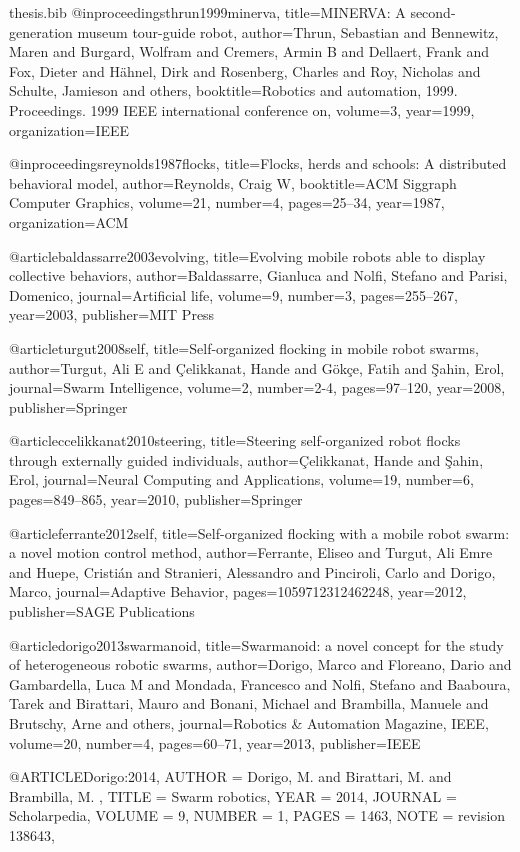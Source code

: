 \documentclass[oneside, a4paper, 12pt]{memoir}
\begin{document}
\begin{filecontents}{thesis.bib}
@inproceedings{thrun1999minerva,
  title={MINERVA: A second-generation museum tour-guide robot},
  author={Thrun, Sebastian and Bennewitz, Maren and Burgard, Wolfram and Cremers, Armin B and Dellaert, Frank and Fox, Dieter and H{\"a}hnel, Dirk and Rosenberg, Charles and Roy, Nicholas and Schulte, Jamieson and others},
  booktitle={Robotics and automation, 1999. Proceedings. 1999 IEEE international conference on},
  volume={3},
  year={1999},
  organization={IEEE}
}

@inproceedings{reynolds1987flocks,
  title={Flocks, herds and schools: A distributed behavioral model},
  author={Reynolds, Craig W},
  booktitle={ACM Siggraph Computer Graphics},
  volume={21},
  number={4},
  pages={25--34},
  year={1987},
  organization={ACM}
}

@article{baldassarre2003evolving,
  title={Evolving mobile robots able to display collective behaviors},
  author={Baldassarre, Gianluca and Nolfi, Stefano and Parisi, Domenico},
  journal={Artificial life},
  volume={9},
  number={3},
  pages={255--267},
  year={2003},
  publisher={MIT Press}
}

@article{turgut2008self,
  title={Self-organized flocking in mobile robot swarms},
  author={Turgut, Ali E and {\c{C}}elikkanat, Hande and G{\"o}k{\c{c}}e, Fatih and {\c{S}}ahin, Erol},
  journal={Swarm Intelligence},
  volume={2},
  number={2-4},
  pages={97--120},
  year={2008},
  publisher={Springer}
}

@article{ccelikkanat2010steering,
  title={Steering self-organized robot flocks through externally guided individuals},
  author={{\c{C}}elikkanat, Hande and {\c{S}}ahin, Erol},
  journal={Neural Computing and Applications},
  volume={19},
  number={6},
  pages={849--865},
  year={2010},
  publisher={Springer}
}

@article{ferrante2012self,
  title={Self-organized flocking with a mobile robot swarm: a novel motion control method},
  author={Ferrante, Eliseo and Turgut, Ali Emre and Huepe, Cristi{\'a}n and Stranieri, Alessandro and Pinciroli, Carlo and Dorigo, Marco},
  journal={Adaptive Behavior},
  pages={1059712312462248},
  year={2012},
  publisher={SAGE Publications}
}

@article{dorigo2013swarmanoid,
  title={Swarmanoid: a novel concept for the study of heterogeneous robotic swarms},
  author={Dorigo, Marco and Floreano, Dario and Gambardella, Luca M and Mondada, Francesco and Nolfi, Stefano and Baaboura, Tarek and Birattari, Mauro and Bonani, Michael and Brambilla, Manuele and Brutschy, Arne and others},
  journal={Robotics \& Automation Magazine, IEEE},
  volume={20},
  number={4},
  pages={60--71},
  year={2013},
  publisher={IEEE}
}

@ARTICLE{Dorigo:2014,
AUTHOR = {Dorigo, M.  and Birattari, M.  and Brambilla, M. },
TITLE   = {{S}warm robotics},
YEAR	= 2014,
JOURNAL	= Scholarpedia,
VOLUME  = 9,
NUMBER  = 1,
PAGES   = 1463,
NOTE   = {{revision 138643}},
}

\end{filecontents}



\end{document}
